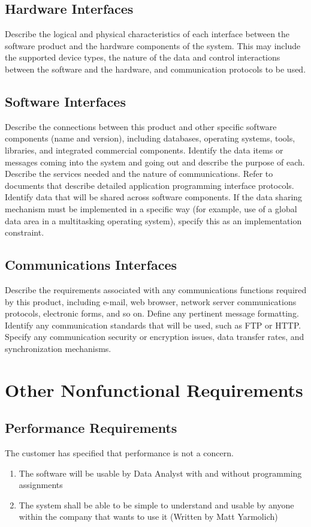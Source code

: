 \documentclass[12pt,oneside,letterpaper]{article}
\begin{document}
\subsection{Hardware Interfaces}
Describe the logical and physical characteristics of each interface between the software product and the hardware components of the system. This may include the supported device types, the nature of the data and control interactions between the software and the hardware, and communication protocols to be used.
\subsection{Software Interfaces}
Describe the connections between this product and other specific software components (name and version), including databases, operating systems, tools, libraries, and integrated commercial components. Identify the data items or messages coming into the system and going out and describe the purpose of each. Describe the services needed and the nature of communications. Refer to documents that describe detailed application programming interface protocols. Identify data that will be shared across software components. If the data sharing mechanism must be implemented in a specific way (for example, use of a global data area in a multitasking operating system), specify this as an implementation constraint.
\subsection{Communications Interfaces}
Describe the requirements associated with any communications functions required by this product, including e-mail, web browser, network server communications protocols, electronic forms, and so on. Define any pertinent message formatting. Identify any communication standards that will be used, such as FTP or HTTP. Specify any communication security or encryption issues, data transfer rates, and synchronization mechanisms.

\section{Other Nonfunctional Requirements}
\subsection{Performance Requirements}
The customer has specified that performance is not a concern.
\begin{enumerate}
    \item The software will be usable by Data Analyst with and without programming assignments
    \item The system shall be able to be simple to understand and usable by anyone within the company that wants to use it (Written by Matt Yarmolich)
\end{enumerate}
\end{document}
